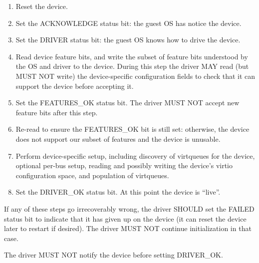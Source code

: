 \begin{enumerate}
\item Reset the device.

\item Set the ACKNOWLEDGE status bit: the guest OS has notice the device.

\item Set the DRIVER status bit: the guest OS knows how to drive the device.

\item\label{itm:General Initialization And Device Operation /
Device Initialization / Read feature bits} Read device feature bits, and write the subset of feature bits
   understood by the OS and driver to the device.  During this step the
   driver MAY read (but MUST NOT write) the device-specific configuration fields to check that it can support the device before accepting it.

\item\label{itm:General Initialization And Device Operation / Device Initialization / Set FEATURES-OK} Set the FEATURES_OK status bit.  The driver MUST NOT accept
   new feature bits after this step.

\item\label{itm:General Initialization And Device Operation / Device Initialization / Re-read FEATURES-OK} Re-read  to ensure the FEATURES_OK bit is still
   set: otherwise, the device does not support our subset of features
   and the device is unusable.

\item\label{itm:General Initialization And Device Operation / Device Initialization / Device-specific Setup} Perform device-specific setup, including discovery of virtqueues for the
   device, optional per-bus setup, reading and possibly writing the
   device's virtio configuration space, and population of virtqueues.

\item\label{itm:General Initialization And Device Operation / Device Initialization / Set DRIVER-OK} Set the DRIVER_OK status bit.  At this point the device is
   ``live''.
\end{enumerate}

If any of these steps go irrecoverably wrong, the driver SHOULD
set the FAILED status bit to indicate that it has given up on the
device (it can reset the device later to restart if desired).  The
driver MUST NOT continue initialization in that case.

The driver MUST NOT notify the device before setting DRIVER_OK.

